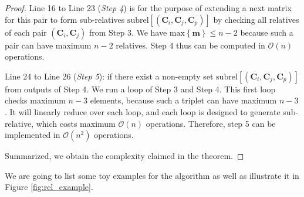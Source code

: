 \begin{proof}
Line 16 to Line 23 (\textit{Step 4}) is for the purpose of extending
a next matrix for this pair to form sub-relatives $\mathrm{subrel}\left[\left(\boldsymbol{C}_{i},\boldsymbol{C}_{j},\boldsymbol{C}_{p}\right)\right]$
by checking all relatives of each pair $\left(\boldsymbol{C}_{i},\boldsymbol{C}_{j}\right)$
from Step 3. We have $\mathrm{max}\left\{ \boldsymbol{m}\right\} \leq n-2$
because such a pair can have maximum $n-2$ relatives. Step 4 thus
can be computed in $\mathcal{O}\left(n\right)$ operations.

Line 24 to Line 26 (\textit{Step 5}): if there exist a non-empty set
$\mathrm{subrel}\left[\left(\boldsymbol{C}_{i},\boldsymbol{C}_{j},\boldsymbol{C}_{p}\right)\right]$
from outputs of Step 4. We run a loop of Step 3 and Step 4. This first
loop checks maximum $n-3$ elements, because such a triplet can have
maximum $n-3$. It will linearly reduce over each loop, and each loop
is designed to generate sub-relative, which costs maximum $\mathcal{O}\left(n\right)$
operations. Therefore, step 5 can be implemented in $\mathcal{O}\left(n^{2}\right)$
operations.

Summarized, we obtain the complexity claimed in the theorem.
\end{proof}
We are going to list some toy examples for the algorithm as well as
illustrate it in Figure \ref{fig:rel_example}.
